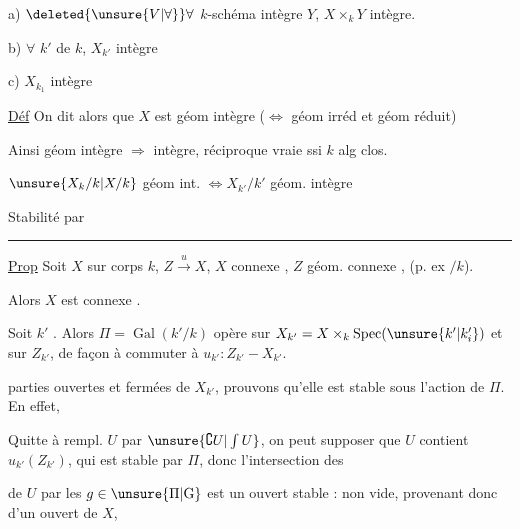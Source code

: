 a) $\deleted{\unsure{V|\forall}}\forall$ $k$-schéma intègre $Y$, $X\times_k Y$ intègre.

b) $\forall$  $k'$ de $k$, $X_{k'}$ intègre

c)  $X_{k_1}$ intègre

\uline{Déf} On dit alors que $X$ est géom intègre ($\Longleftrightarrow$ géom irréd et géom réduit)

Ainsi géom intègre $\Rightarrow$ intègre, réciproque vraie ssi $k$ alg clos.

$\unsure{X_k/k|X/k}$ géom int. $\Longleftrightarrow X_{k'}/k'$ géom. intègre

Stabilité par 

\par\noindent\rule{.22\linewidth}{.4pt}\par
\uline{Prop} Soit $X$ sur corps $k$, $Z\xrightarrow{u}X$, $X$ connexe , $Z$ géom. connexe , (p. ex  $/k$).

\noindent\vrule\enspace Alors $X$ est  connexe .

Soit $k'$  . Alors $\Pi=\operatorname{Gal}(k'/k)$ opère sur $X_{k'}=X\times_k\operatorname{Spec}(\unsure{k'|k'_i})$ et sur $Z_{k'}$, de façon à commuter à $u_{k'}: Z_{k'} - X_{k'}$.

  parties ouvertes et fermées de $X_{k'}$,     prouvons qu'elle est stable sous l'action de $\Pi$. En effet,

 Quitte à rempl. $U$ par $\unsure{\complement U|\int U}$, on peut supposer que $U$ contient $u_{k'}(Z_{k'})$, qui est stable par $\Pi$, donc l'intersection  des

  de $U$ par les $g\in \unsure{\Pi|\mathrm{G}}$ est un ouvert stable  :  non vide, provenant donc d'un ouvert  de $X$, 

